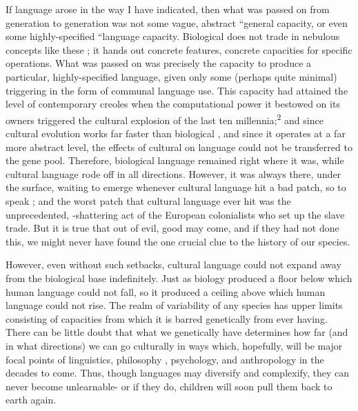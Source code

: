 If language arose in the way I have indicated, then what was passed on from generation to generation was not some vague, abstract ``general  capacity, or even some highly-specified ``language
 capacity. Biological  does not trade in nebulous concepts like these ; it hands out concrete features, concrete capacities for specific operations. What was passed on was precisely the capacity to produce a particular, highly-specified language, given only some (perhaps quite minimal) triggering in the form of communal language use. This capacity had attained the level of contemporary creoles when the computational power it bestowed on its owners triggered the cultural explosion of the last ten millennia;\textsuperscript{2} and since cultural evolu\-tion works far faster than biological , and since it operates at a far more abstract level, the effects of cultural  on language could not be transferred to the gene pool. Therefore, biological lan\-guage remained right where it was, while cultural language rode off in all directions. However, it was always there, under the surface, waiting to emerge whenever cultural language hit a bad patch, so to speak ; and the worst patch that cultural language ever hit was the unprece\-dented, -shattering act of the European colonialists who set up the slave trade. But it is true that out of evil, good may come, and if they had not done this, we might never have found the one crucial clue to the history of our species.

However, even without such setbacks, cultural language could not expand away from the biological base indefinitely. Just as biology produced a floor below which human language could not fall, so it produced a ceiling above which human language could not rise. The realm of variability of any species has upper limits consisting of capa\-cities from which it is barred genetically from ever having. There can be little doubt that what we genetically have determines how far (and in what directions) we can go culturally in ways which, hopefully, will be major focal points of linguistics, philosophy , psychology, and anthropology in the decades to come. Thus, though languages may diversify and complexify, they can never become unlearnable- or if they do, children will soon pull them back to earth again.

